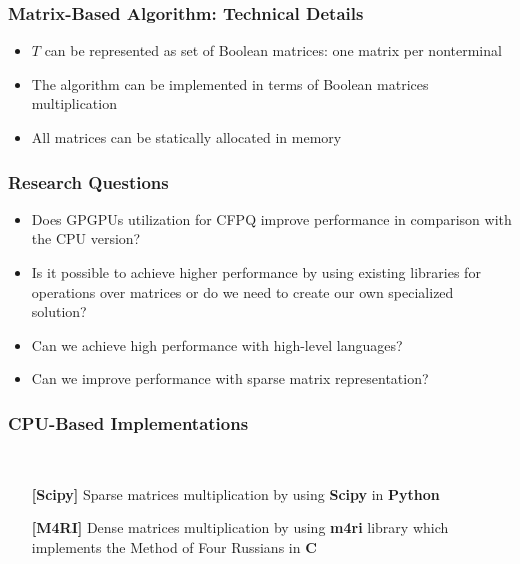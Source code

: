 \documentclass[xcolor=table]{beamer}
\begin{document}
  \begin{frame}[fragile] \frametitle{Matrix-Based Algorithm: Technical Details}
    \begin{itemize}
      \item $T$ can be represented as  set of Boolean matrices: one matrix per nonterminal
      \item The algorithm can be implemented in terms of Boolean matrices multiplication
      \item All matrices can be statically allocated in memory
    \end{itemize}
  \end{frame}


\begin{frame}[fragile] \frametitle{Research Questions}
  \begin{itemize}
    \item Does GPGPUs utilization for CFPQ improve performance in comparison with the CPU version?
    \pause
    \item Is it possible to achieve higher performance by using existing libraries for operations over matrices or do we need to create our own specialized solution?
    \pause
    \item Can we achieve high performance with high-level languages?
    \pause
    \item Can we improve performance with sparse matrix representation?
  \end{itemize}
\end{frame}


\begin{frame}[fragile] \frametitle{CPU-Based Implementations}
  \begin{minipage}[t]{1cm}
\hspace{1cm}
  \end{minipage}
  ~
\begin{minipage}[t]{0.85\textwidth}
\begin{itemize}
  \item[\textbf{[Scipy]}] Sparse matrices multiplication by using \textbf{Scipy} in \textbf{Python}
\pause
  \item[\textbf{[M4RI]}] Dense matrices multiplication by using \textbf{m4ri} library which implements the Method of Four Russians in \textbf{C}
\end{itemize}
\end{minipage}
\end{frame}
\end{document}
